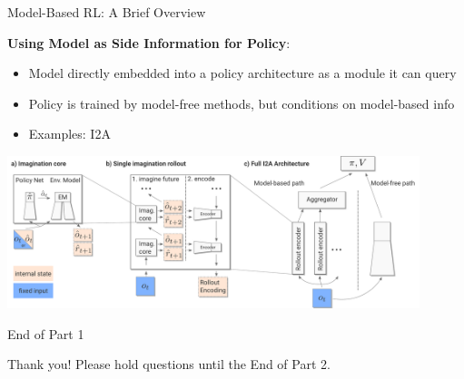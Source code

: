 \documentclass[9pt]{beamer}
\begin{document}
\begin{frame}{Model-Based RL: A Brief Overview}

\textbf{Using Model as Side Information for Policy}:
\begin{itemize}
\item Model directly embedded into a policy architecture as a module it can query
\item Policy is trained by model-free methods, but conditions on model-based info
\item Examples: I2A
\end{itemize}

\begin{center}
\includegraphics[width=0.9\textwidth]{i2a}
\end{center}

\end{frame}

\begin{frame}{End of Part 1}

Thank you! Please hold questions until the End of Part 2.
\end{frame}
\end{document}
